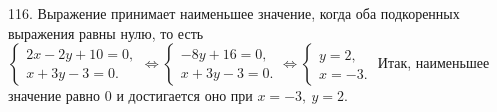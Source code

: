 116. Выражение принимает наименьшее значение, когда оба подкоренных выражения равны нулю, то есть $\begin{cases} 2x-2y+10=0,\\ x+3y-3=0.\end{cases}
\Leftrightarrow \begin{cases} -8y+16=0,\\ x+3y-3=0.\end{cases}\Leftrightarrow \begin{cases} y=2,\\ x=-3.\end{cases}$ Итак, наименьшее значение равно 0 и достигается оно при $x=-3,\ y=2.$\\
